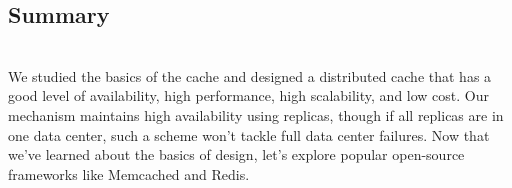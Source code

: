 \subsection{Summary}\label{3m7Bk-6hDFE6i5xmRBSyi}
\\
We studied the basics of the cache and designed a distributed cache that has a good level of availability, high performance, high scalability, and low cost. Our mechanism maintains high availability using replicas, though if all replicas are in one data center, such a scheme won't tackle full data center failures. Now that we've learned about the basics of design, let's explore popular open-source frameworks like Memcached and Redis.\\

